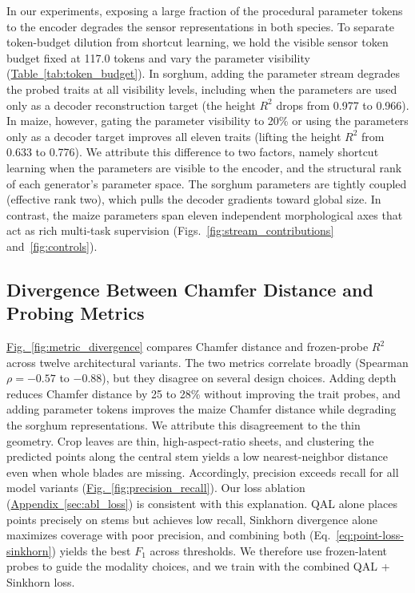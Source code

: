 \documentclass[10pt,twocolumn,letterpaper]{article}
\newcommand{\figref}[1]{\hyperref[#1]{Fig.~\ref*{#1}}}
\newcommand{\tabref}[1]{\hyperref[#1]{Table~\ref*{#1}}}
\newcommand{\appendixref}[1]{\hyperref[#1]{Appendix~\ref*{#1}}}
\begin{document}
In our experiments, exposing a large fraction of the procedural parameter tokens to the encoder degrades the sensor representations in both species. To separate token-budget dilution from shortcut learning, we hold the visible sensor token budget fixed at 117.0 tokens and vary the parameter visibility (\tabref{tab:token_budget}). In sorghum, adding the parameter stream degrades the probed traits at all visibility levels, including when the parameters are used only as a decoder reconstruction target (the height $R^2$ drops from 0.977 to 0.966). In maize, however, gating the parameter visibility to 20\% or using the parameters only as a decoder target improves all eleven traits (lifting the height $R^2$ from 0.633 to 0.776). We attribute this difference to two factors, namely shortcut learning when the parameters are visible to the encoder, and the structural rank of each generator's parameter space. The sorghum parameters are tightly coupled (effective rank two), which pulls the decoder gradients toward global size. In contrast, the maize parameters span eleven independent morphological axes that act as rich multi-task supervision (\textcolor{cvprblue}{Figs.}~\ref{fig:stream_contributions} and~\ref{fig:controls}).


\subsection{Divergence Between Chamfer Distance and Probing Metrics}
\label{sec:res-metrics}\label{sec:exp-metrics}

\figref{fig:metric_divergence} compares Chamfer distance and frozen-probe $R^2$ across twelve architectural variants. The two metrics correlate broadly (Spearman $\rho = -0.57$ to $-0.88$), but they disagree on several design choices. Adding depth reduces Chamfer distance by 25 to 28\% without improving the trait probes, and adding parameter tokens improves the maize Chamfer distance while degrading the sorghum representations. We attribute this disagreement to the thin geometry. Crop leaves are thin, high-aspect-ratio sheets, and clustering the predicted points along the central stem yields a low nearest-neighbor distance even when whole blades are missing. Accordingly, precision exceeds recall for all model variants (\figref{fig:precision_recall}). Our loss ablation (\appendixref{sec:abl_loss}) is consistent with this explanation. QAL alone places points precisely on stems but achieves low recall, Sinkhorn divergence alone maximizes coverage with poor precision, and combining both (Eq.~\ref{eq:point-loss-sinkhorn}) yields the best $F_1$ across thresholds. We therefore use frozen-latent probes to guide the modality choices, and we train with the combined QAL + Sinkhorn loss.
\end{document}
